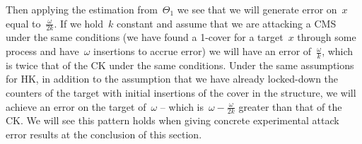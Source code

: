 Then applying the estimation from~$\Theta_1$ we see that we will generate error on~$x$ equal to~$\frac{\omega}{2k}$. If we hold~$k$ constant and assume that we are attacking a CMS under the same conditions (we have found a 1-cover for a target~$x$ through some process and have~$\omega$ insertions to accrue error) we will have an error of~$\frac{\omega}{k}$, which is twice that of the CK under the same conditions. Under the same assumptions for HK, in addition to the assumption that we have already locked-down the counters of the target with initial insertions of the cover in the structure, we will achieve an error on the target of~$\omega$ -- which is~$\omega - \frac{\omega}{2k}$ greater than that of the CK. We will see this pattern holds when giving concrete experimental attack error results at the conclusion of this section.

